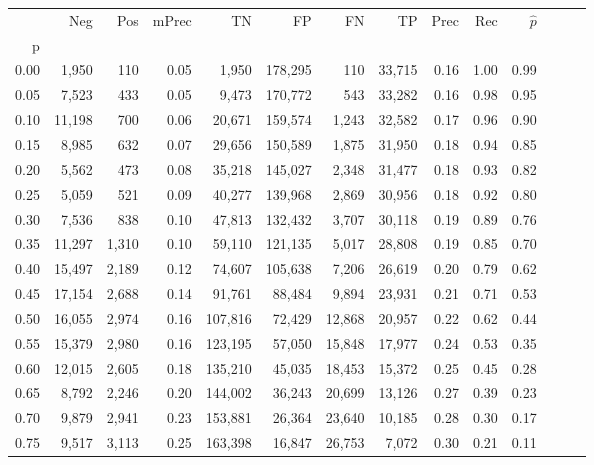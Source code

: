 \begin{tabular}{rrrrrrrrrrrrrr}
\toprule
{} &     Neg &    Pos & mPrec &       TN &       FP &      FN &      TP &  Prec &   Rec & $\hat{p}$ \\
p    &         &        &       &          &          &         &         &       &       &           \\
\midrule
0.00 &   1,950 &    110 &  0.05 &    1,950 &  178,295 &     110 &  33,715 &  0.16 &  1.00 &      0.99 \\
0.05 &   7,523 &    433 &  0.05 &    9,473 &  170,772 &     543 &  33,282 &  0.16 &  0.98 &      0.95 \\
0.10 &  11,198 &    700 &  0.06 &   20,671 &  159,574 &   1,243 &  32,582 &  0.17 &  0.96 &      0.90 \\
0.15 &   8,985 &    632 &  0.07 &   29,656 &  150,589 &   1,875 &  31,950 &  0.18 &  0.94 &      0.85 \\
0.20 &   5,562 &    473 &  0.08 &   35,218 &  145,027 &   2,348 &  31,477 &  0.18 &  0.93 &      0.82 \\
0.25 &   5,059 &    521 &  0.09 &   40,277 &  139,968 &   2,869 &  30,956 &  0.18 &  0.92 &      0.80 \\
0.30 &   7,536 &    838 &  0.10 &   47,813 &  132,432 &   3,707 &  30,118 &  0.19 &  0.89 &      0.76 \\
0.35 &  11,297 &  1,310 &  0.10 &   59,110 &  121,135 &   5,017 &  28,808 &  0.19 &  0.85 &      0.70 \\
0.40 &  15,497 &  2,189 &  0.12 &   74,607 &  105,638 &   7,206 &  26,619 &  0.20 &  0.79 &      0.62 \\
0.45 &  17,154 &  2,688 &  0.14 &   91,761 &   88,484 &   9,894 &  23,931 &  0.21 &  0.71 &      0.53 \\
0.50 &  16,055 &  2,974 &  0.16 &  107,816 &   72,429 &  12,868 &  20,957 &  0.22 &  0.62 &      0.44 \\
0.55 &  15,379 &  2,980 &  0.16 &  123,195 &   57,050 &  15,848 &  17,977 &  0.24 &  0.53 &      0.35 \\
0.60 &  12,015 &  2,605 &  0.18 &  135,210 &   45,035 &  18,453 &  15,372 &  0.25 &  0.45 &      0.28 \\
0.65 &   8,792 &  2,246 &  0.20 &  144,002 &   36,243 &  20,699 &  13,126 &  0.27 &  0.39 &      0.23 \\
0.70 &   9,879 &  2,941 &  0.23 &  153,881 &   26,364 &  23,640 &  10,185 &  0.28 &  0.30 &      0.17 \\
0.75 &   9,517 &  3,113 &  0.25 &  163,398 &   16,847 &  26,753 &   7,072 &  0.30 &  0.21 &      0.11 \\

\end{tabular}
